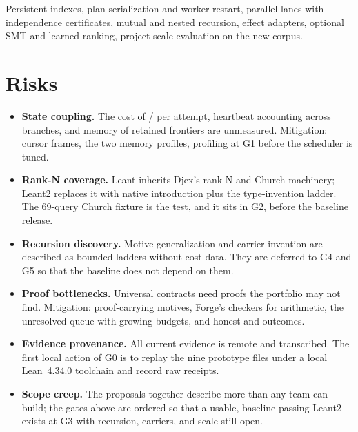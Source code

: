 \begin{description}[style=nextline]
\item[G6 Scale.] Persistent indexes, plan serialization and worker restart, parallel lanes with independence certificates, mutual and nested recursion, effect adapters, optional SMT and learned ranking, project-scale evaluation on the new corpus.
\end{description}

\section{Risks}\label{sec:risks}

\begin{itemize}
\item \textbf{State coupling.} The cost of / per attempt, heartbeat accounting across branches, and memory of retained frontiers are unmeasured. Mitigation: cursor frames, the two memory profiles, profiling at G1 before the scheduler is tuned.
\item \textbf{Rank-N coverage.} Leant inherits Djex's rank-N and Church machinery; Leant2 replaces it with native introduction plus the type-invention ladder. The 69-query Church fixture is the test, and it sits in G2, before the baseline release.
\item \textbf{Recursion discovery.} Motive generalization and carrier invention are described as bounded ladders without cost data. They are deferred to G4 and G5 so that the baseline does not depend on them.
\item \textbf{Proof bottlenecks.} Universal contracts need proofs the portfolio may not find. Mitigation: proof-carrying motives, Forge's checkers for arithmetic, the unresolved queue with growing budgets, and honest  and  outcomes.
\item \textbf{Evidence provenance.} All current evidence is remote and transcribed. The first local action of G0 is to replay the nine prototype files under a local Lean~4.34.0 toolchain and record raw receipts.
\item \textbf{Scope creep.} The proposals together describe more than any team can build; the gates above are ordered so that a usable, baseline-passing Leant2 exists at G3 with recursion, carriers, and scale still open.
\end{itemize}
